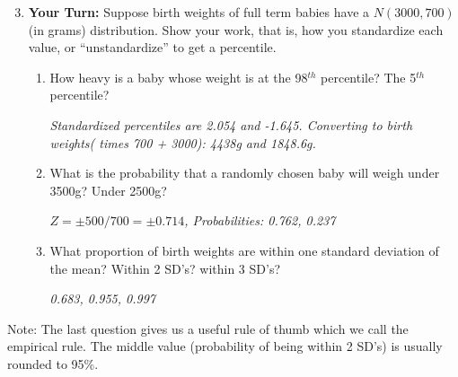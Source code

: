 \begin{enumerate}
\setcounter{enumi}{2}
\item {\bf Your Turn:} Suppose birth weights of full term babies have
  a $N(3000, 700)$ (in grams) distribution. Show your work, that is,
  how you standardize each value, or ``unstandardize'' to get a
  percentile.
\begin{enumerate}
\item 
  How heavy is a baby whose weight is at the  98$^{th}$
  percentile? The 5$^{th}$ percentile? 
\begin{students}
        \vspace{1cm}        
\end{students}

\begin{key}
{\it Standardized percentiles are 2.054 and -1.645.  Converting to
    birth 
    weights( times 700 + 3000): 4438g and 1848.6g. }
\end{key}

\item What is the probability that a randomly chosen baby will weigh
  under 3500g?  Under 2500g?
\begin{students}
        \vspace{1cm}        
\end{students}

\begin{key}
 {\it $Z = \pm 500/700 = \pm 0.714$, Probabilities: 0.762, 0.237}
\end{key}
\item What proportion of birth weights are within one standard deviation of the  mean? Within 2 SD's? within 3 SD's?
\begin{students}
        \vspace{.5cm}        
\end{students}

\begin{key}
 {\it 0.683, 0.955, 0.997 }
\end{key}

  \end{enumerate}
\end{enumerate}

Note: The last question gives us a useful rule of thumb which we call
the empirical rule.  The middle value (probability of being within
2 SD's) is usually rounded to 95\%.
\begin{students}

\end{students}

